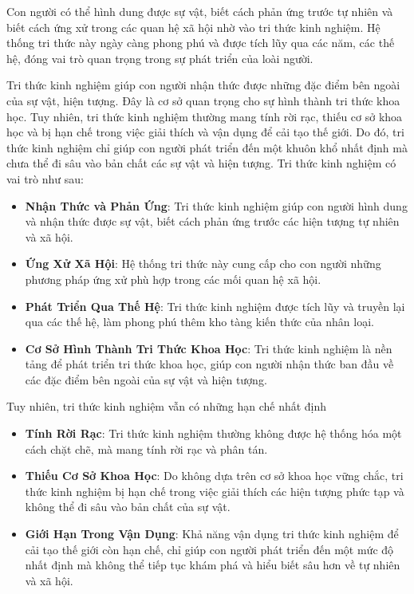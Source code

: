 Con người có thể hình dung được sự vật, biết cách phản ứng trước tự nhiên và biết cách ứng xử trong các quan hệ xã hội nhờ vào tri thức kinh nghiệm. Hệ thống tri thức này ngày càng phong phú và được tích lũy qua các năm, các thế hệ, đóng vai trò quan trọng trong sự phát triển của loài người.

Tri thức kinh nghiệm giúp con người nhận thức được những đặc điểm bên ngoài của sự vật, hiện tượng. Đây là cơ sở quan trọng cho sự hình thành tri thức khoa học. Tuy nhiên, tri thức kinh nghiệm thường mang tính rời rạc, thiếu cơ sở khoa học và bị hạn chế trong việc giải thích và vận dụng để cải tạo thế giới. Do đó, tri thức kinh nghiệm chỉ giúp con người phát triển đến một khuôn khổ nhất định mà chưa thể đi sâu vào bản chất các sự vật và hiện tượng. Tri thức kinh nghiệm có vai trò như sau:
\begin{itemize}
    \item \textbf{Nhận Thức và Phản Ứng}: Tri thức kinh nghiệm giúp con người hình dung và nhận thức được sự vật, biết cách phản ứng trước các hiện tượng tự nhiên và xã hội.
    \item \textbf{Ứng Xử Xã Hội}: Hệ thống tri thức này cung cấp cho con người những phương pháp ứng xử phù hợp trong các mối quan hệ xã hội.
    \item \textbf{Phát Triển Qua Thế Hệ}: Tri thức kinh nghiệm được tích lũy và truyền lại qua các thế hệ, làm phong phú thêm kho tàng kiến thức của nhân loại.
    \item \textbf{Cơ Sở Hình Thành Tri Thức Khoa Học}: Tri thức kinh nghiệm là nền tảng để phát triển tri thức khoa học, giúp con người nhận thức ban đầu về các đặc điểm bên ngoài của sự vật và hiện tượng.
\end{itemize}

Tuy nhiên, tri thức kinh nghiệm vẫn có những hạn chế nhất định
\begin{itemize}
    \item \textbf{Tính Rời Rạc}: Tri thức kinh nghiệm thường không được hệ thống hóa một cách chặt chẽ, mà mang tính rời rạc và phân tán.
    \item \textbf{Thiếu Cơ Sở Khoa Học}: Do không dựa trên cơ sở khoa học vững chắc, tri thức kinh nghiệm bị hạn chế trong việc giải thích các hiện tượng phức tạp và không thể đi sâu vào bản chất của sự vật.
    \item \textbf{Giới Hạn Trong Vận Dụng}: Khả năng vận dụng tri thức kinh nghiệm để cải tạo thế giới còn hạn chế, chỉ giúp con người phát triển đến một mức độ nhất định mà không thể tiếp tục khám phá và hiểu biết sâu hơn về tự nhiên và xã hội.
\end{itemize}

